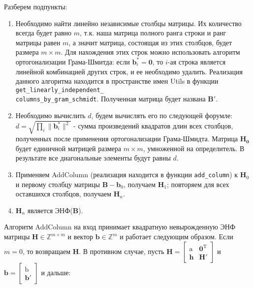 Разберем подпункты:

\begin{enumerate}
\item Необходимо найти линейно независимые столбцы матрицы. Их количество всегда будет равно $ m $, т.к. наша матрица полного ранга строки и ранг матрицы равен $ m $, а значит матрица, состоящая из этих столбцов, будет размера $ m \times m $. Для нахождения этих строк можно использовать алгоритм ортогонализации Грама-Шмитда: если $ \mathbf{b}_i^*=\mathbf{0} $, то $ i $-ая строка является линейной комбинацией других строк, и ее необходимо удалить. Реализация данного алгоритма находится в пространстве имен Utils в функции \verb! get_linearly_independent_!\\ \verb!columns_by_gram_schmidt!. Полученная матрица будет названа $  \mathbf{B}' $.
\item Необходимо вычислить $ d $, будем вычислять его по следующей форумле: $ d=\sqrt{\prod_i{\|\mathbf{b}_i^\ast\|^2}} $ - сумма произведений квадратов длин всех столбцов, полученных после применения ортогонализации Грама-Шмидта. Матрица $ \mathbf{H}_\mathbf{0} $ будет единичной матрицей размера $ m \times m $, умноженной на определитель. В результате все диагональные элементы будут равны $ d $.
\item Применяем AddColumn (реализация находится в функции \verb!add_column!) к $ \mathbf{H}_0 $ и первому столбцу матрицы $ \mathbf{B} - \mathbf{b}_0 $, получаем $ \mathbf{H}_1 $; повторяем для всех оставшихся столбцов, получаем $ \mathbf{H}_n $.
\item $ \mathbf{H}_n $ является ЭНФ($ \mathbf{B} $).
\end{enumerate}

Алгоритм AddColumn на вход принимает квадратную невырожденную ЭНФ матрицы $ \mathbf{H} \in \mathbb{Z}^{m \times m} $ и вектор $ \mathbf{b} \in \mathbb{Z}^m $ и работает следующим образом. Если $ m = 0 $, то возвращаем $ \mathbf{H} $. В противном случае, пусть 
$ \mathbf{H} = \left[ \begin{array}{cccc}
\mathrm{a} & \mathbf{0}^\mathrm{T} \\
\mathbf{h} & \mathbf{H}' \end{array} \right] $ и 
$ \mathbf{b} = \left[ \begin{array}{cccc}
\mathrm{b} \\
\mathbf{b}' \end{array} \right] $ и дальше:

